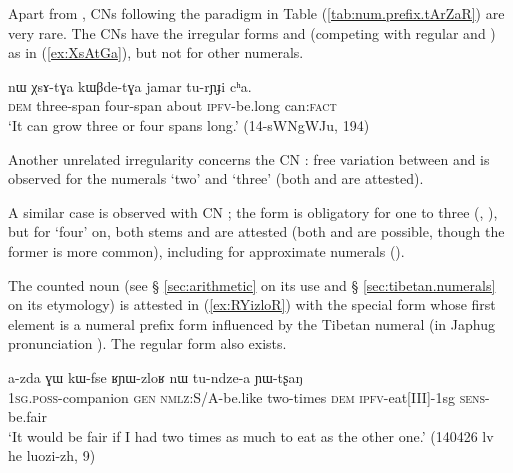 Apart from  , CNs following the paradigm in Table (\ref{tab:num.prefix.tArZaR}) are very rare. The CNs   have the irregular forms  and  (competing with regular  and ) as in (\ref{ex:XsAtGa}), but not for other numerals. 

\begin{exe}
\ex \label{ex:XsAtGa}
\gll nɯ χsɤ-tɣa kɯβde-tɣa jamar tu-rɲɟi cʰa. \\
\textsc{dem} three-span four-span about \textsc{ipfv}-be.long can:\textsc{fact} \\
\glt `It can grow three or four spans long.' (14-sWNgWJu, 194)
\end{exe}

Another unrelated irregularity concerns the CN : free variation between  and  is observed for the numerals `two' and `three' (both  and  are attested).

A similar case is observed with CN ; the form  is obligatory for one to three (, ), but for `four' on, both stems  and  are attested (both  and  are possible, though the former is more common), including for approximate numerals ().  

The counted noun  (see § \ref{sec:arithmetic} on its use and § \ref{sec:tibetan.numerals} on its etymology) is attested in (\ref{ex:RYizloR}) with the special form  whose first element is a numeral prefix form  influenced by the Tibetan numeral  (in Japhug pronunciation ). The regular form  also exists.
 
\begin{exe}
\ex \label{ex:RYizloR}
\gll a-zda ɣɯ kɯ-fse ʁɲɯ-zloʁ nɯ tu-ndze-a ɲɯ-tʂaŋ \\
 \textsc{1sg}.\textsc{poss}-companion \textsc{gen} \textsc{nmlz}:S/A-be.like two-times \textsc{dem} \textsc{ipfv}-eat[III]-1sg \textsc{sens}-be.fair \\
\glt `It would be fair if I had two times as much to eat as the other one.' (140426 lv he luozi-zh, 9)
\end{exe}

